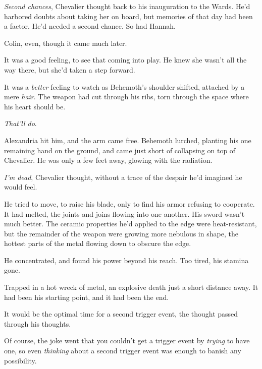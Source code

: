 \emph{Second chances}, Chevalier thought back to his inauguration to the Wards.  He'd harbored doubts about taking her on board, but memories of that day had been a factor.  He'd needed a second chance.  So had Hannah.



Colin, even, though it came much later.



It was a good feeling, to see that coming into play.  He knew she wasn't all the way there, but she'd taken a step forward.



It was a \emph{better} feeling to watch as Behemoth's shoulder shifted, attached by a mere \emph{hair}.  The weapon had cut through his ribs, torn through the space where his heart should be.



\emph{That'll do}.



Alexandria hit him, and the arm came free.  Behemoth lurched, planting his one remaining hand on the ground, and came just short of collapsing on top of Chevalier.  He was only a few feet away, glowing with the radiation.



\emph{I'm dead}, Chevalier thought, without a trace of the despair he'd imagined he would feel.



He tried to move, to raise his blade, only to find his armor refusing to cooperate.  It had melted, the joints and joins flowing into one another.  His sword wasn't much better.  The ceramic properties he'd applied to the edge were heat-resistant, but the remainder of the weapon were growing more nebulous in shape, the hottest parts of the metal flowing down to obscure the edge.



He concentrated, and found his power beyond his reach.  Too tired, his stamina gone.



Trapped in a hot wreck of metal, an explosive death just a short distance away.  It had been his starting point, and it had been the end.



It would be the optimal time for a second trigger event, the thought passed through his thoughts.



Of course, the joke went that you couldn't get a trigger event by \emph{trying }to have one, so even \emph{thinking} about a second trigger event was enough to banish any possibility.



